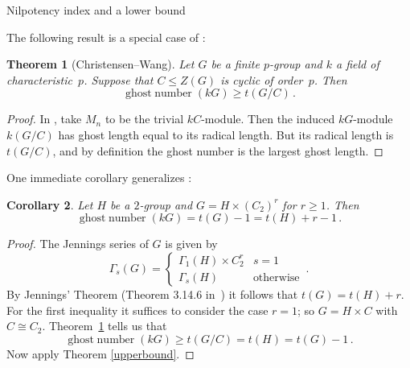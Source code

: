 \documentclass[12pt,reqno]{amsart}
\newtheorem{thm}{Theorem}[section]
\newtheorem{cor}[thm]{Corollary}
\theoremstyle{definition}
\theoremstyle{remark}
\begin{document}
\begin{section}{Nilpotency index and a lower bound}

\noindent
The following result is a special case of \cite[Thm 4.3]{ChristensenWang:ghostNumbers}:

\begin{thm}[Christensen--Wang]
\label{thm:CW-lower}
Let $G$ be a finite $p$-group and $k$ a field of characteristic~$p$. Suppose that $C \leq Z(G)$ is cyclic of order~$p$. Then
\[
{\operatorname{ghost\;number}}(kG) \geq t(G/C) \, .
\]
\end{thm}

\begin{proof}
In \cite[Thm 4.3]{ChristensenWang:ghostNumbers}, take $M_n$ to be the trivial $kC$-module. Then the induced $kG$-module $k(G/C)$ has ghost length equal to its radical length. But its radical length is $t(G/C)$, and by definition the ghost number is the largest ghost length.
\end{proof}

\noindent One immediate corollary generalizes \cite[Corollary~5.12]{CheboluChristensenMinac:ghosts}:

\begin{cor}
\label{cor:directproduct}
Let $H$ be a $2$-group and $G=H\times (C_2)^r$ for $r\geq 1$.
Then
\[
{\operatorname{ghost\;number}}(kG) = t(G) - 1 = t(H)+r-1 \, .
\]
\end{cor}

\begin{proof}
The  Jennings series of $G$ is given by
\[
\Gamma_s(G) = \begin{cases} \Gamma_1(H) \times C_2^r & s=1 \\ \Gamma_s(H) & \text{otherwise} \end{cases} \, .
\]
By Jennings' Theorem (Theorem 3.14.6 in~\cite{Benson:I}) it follows that $t(G) = t(H)+r$. For the first inequality it suffices to consider the case $r=1$; so $G = H \times C$ with $C \cong C_2$. Theorem~\ref{thm:CW-lower} tells us that
\[
{\operatorname{ghost\;number}}(kG) \geq t(G/C) = t(H) = t(G)-1 \, .
\]
Now apply Theorem \ref{upperbound}\@.
\end{proof}

\end{section}
\end{document}
